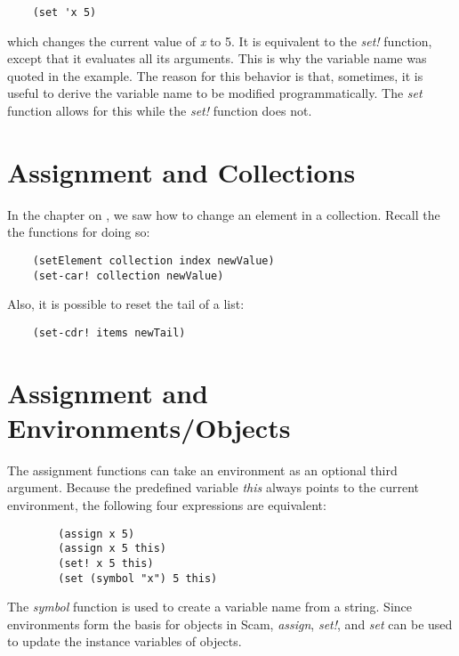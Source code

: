 \begin{verbatim}
    (set 'x 5)
\end{verbatim}

which changes the current value of {\it x} to 5.
It is equivalent to the {\it set!} function,
except that it evaluates all its arguments. This
is why the variable name was quoted in the example.
The reason for this behavior is that, sometimes,
it is useful to derive the variable name
to be modified programmatically. The {\it set} function
allows for this while the {\it set!} function does not.

\section{Assignment and Collections}

In the chapter on
,
we saw how to change an element in a collection. Recall the
the functions for doing so:

\begin{verbatim}
    (setElement collection index newValue)
    (set-car! collection newValue)
\end{verbatim}

Also, it is possible to reset the tail of a list:

\begin{verbatim}
    (set-cdr! items newTail)
\end{verbatim}

\section{Assignment and Environments/Objects}

The assignment functions can take an environment as an
optional third argument.
Because the predefined variable
{\it this} always points to the current environment,
the following
four expressions are equivalent:

\begin{verbatim}
        (assign x 5)
        (assign x 5 this)
        (set! x 5 this)
        (set (symbol "x") 5 this)
\end{verbatim}

The {\it symbol} function is used to create a variable name from
a string.
Since environments form the basis for objects in Scam,
{\it assign}, {\it set!}, and {\it set} 
can be used to update the instance variables
of objects.
